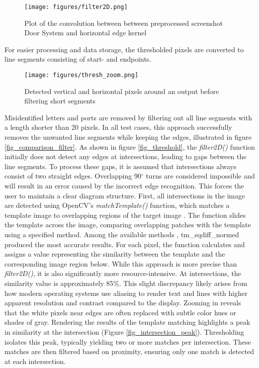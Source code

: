 \begin{figure}[htb]
  \centering
  \texttt{[image: figures/filter2D.png]}
  \caption{Plot of the convolution between between preprocessed screenshot Door System and horizontal edge kernel}
  \label{fig_filter2d}
\end{figure}

For easier processing and data storage, the thresholded pixels are converted to line segments consisting of start- and endpoints.

\begin{figure}[htb]
  \centering
  \texttt{[image: figures/thresh\_zoom.png]}
  \caption{Detected vertical and horizontal pixels around an output before filtering short segments}
  \label{fig_misidentified_edges}
\end{figure}

Misidentified letters and ports are removed by filtering out all line segments with a length shorter than 20 pixels. In all test cases, this approach successfully removes the unwanted line segments while keeping the edges, illustrated in figure \ref{fig_comparison_filter}.
As shown in figure \ref{fig_threshold}, the \textit{filter2D()} function initially does not detect any edges at intersections, leading to gaps between the line segments. To process these gaps, it is assumed that intersections always consist of two straight edges. Overlapping 90$^{\circ}$ turns are considered impossible and will result in an error caused by the incorrect edge recognition. This forces the user to maintain a clear diagram structure.
First, all intersections in the image are detected using OpenCV's \textit{matchTemplate()} function, which matches a template image to overlapping regions of the target image \cite{web_matchTemplate}.
The function slides the template across the image, comparing overlapping patches with the template using a specified method. Among the available methods \cite{comparison_methods}, tm\_sqdiff\_normed produced the most accurate results. For each pixel, the function calculates and assigns a value representing the similarity between the template and the corresponding image region below. While this approach is more precise than \textit{filter2D()}, it is also significantly more resource-intensive.
At intersections, the similarity value is approximately 85\%. This slight discrepancy likely arises from how modern operating systems use aliasing to render text and lines with higher apparent resolution and contrast compared to the display. Zooming in reveals that the white pixels near edges are often replaced with subtle color hues or shades of gray. Rendering the results of the template matching highlights a peak in similarity at the intersection (Figure \ref{fig_intersection_peak}). Thresholding isolates this peak, typically yielding two or more matches per intersection. These matches are then filtered based on proximity, ensuring only one match is detected at each intersection.

